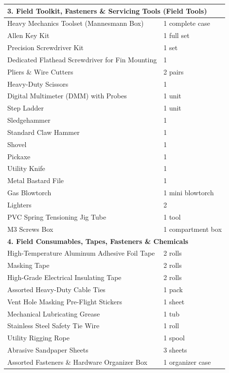 \documentclass[11pt, a4paper]{article} %
\begin{document}
\begin{longtable}{p{} p{}}
\multicolumn{2}{l}{\textbf{3. Field Toolkit, Fasteners \& Servicing Tools (Field Tools)}} \\
\midrule
Heavy Mechanics Toolset (Mannesmann Box) & 1 complete case \\
Allen Key Kit & 1 full set \\
Precision Screwdriver Kit & 1 set \\
Dedicated Flathead Screwdriver for Fin Mounting & 1 \\
Pliers \& Wire Cutters & 2 pairs \\
Heavy-Duty Scissors & 1 \\
Digital Multimeter (DMM) with Probes & 1 unit \\
Step Ladder & 1 unit \\
Sledgehammer & 1 \\
Standard Claw Hammer & 1 \\
Shovel & 1 \\
Pickaxe & 1 \\
Utility Knife & 1 \\
Metal Bastard File & 1 \\
Gas Blowtorch & 1 mini blowtorch \\
Lighters & 2 \\
PVC Spring Tensioning Jig Tube & 1 tool \\
M3 Screws Box & 1 compartment box \\
\midrule

\multicolumn{2}{l}{\textbf{4. Field Consumables, Tapes, Fasteners \& Chemicals}} \\
\midrule
High-Temperature Aluminum Adhesive Foil Tape & 2 rolls \\
Masking Tape & 2 rolls \\
High-Grade Electrical Insulating Tape & 2 rolls \\
Assorted Heavy-Duty Cable Ties & 1 pack \\
Vent Hole Masking Pre-Flight Stickers & 1 sheet \\
Mechanical Lubricating Grease & 1 tub \\
Stainless Steel Safety Tie Wire & 1 roll \\
Utility Rigging Rope & 1 spool \\
Abrasive Sandpaper Sheets & 3 sheets \\
Assorted Fasteners \& Hardware Organizer Box & 1 organizer case \\
\midrule


\end{longtable}
\end{document}
